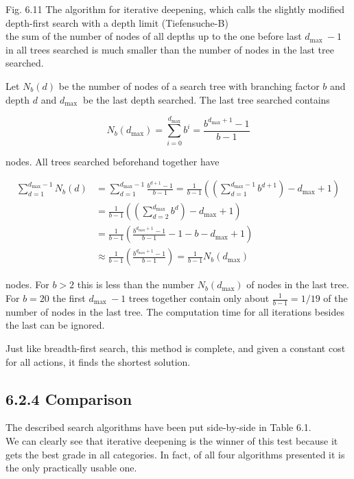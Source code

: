 \documentclass[10pt]{article}
\begin{document}
Fig. 6.11 The algorithm for iterative deepening, which calls the slightly modified depth-first search with a depth limit (Tiefensuche-B)\\
the sum of the number of nodes of all depths up to the one before last $d_{\text {max }}-1$ in all trees searched is much smaller than the number of nodes in the last tree searched.


Let $N_{b}(d)$ be the number of nodes of a search tree with branching factor $b$ and depth $d$ and $d_{\text {max }}$ be the last depth searched. The last tree searched contains

$$
N_{b}\left(d_{\max }\right)=\sum_{i=0}^{d_{\max }} b^{i}=\frac{b^{d_{\max }+1}-1}{b-1}
$$

nodes. All trees searched beforehand together have

$$
\begin{aligned}
\sum_{d=1}^{d_{\max }-1} N_{b}(d) & =\sum_{d=1}^{d_{\max }-1} \frac{b^{d+1}-1}{b-1}=\frac{1}{b-1}\left(\left(\sum_{d=1}^{d_{\max }-1} b^{d+1}\right)-d_{\max }+1\right) \\
& =\frac{1}{b-1}\left(\left(\sum_{d=2}^{d_{\max }} b^{d}\right)-d_{\max }+1\right) \\
& =\frac{1}{b-1}\left(\frac{b^{d_{\max }+1}-1}{b-1}-1-b-d_{\max }+1\right) \\
& \approx \frac{1}{b-1}\left(\frac{b^{d_{\max }+1}-1}{b-1}\right)=\frac{1}{b-1} N_{b}\left(d_{\max }\right)
\end{aligned}
$$

nodes. For $b>2$ this is less than the number $N_{b}\left(d_{\max }\right)$ of nodes in the last tree. For $b=20$ the first $d_{\text {max }}-1$ trees together contain only about $\frac{1}{b-1}=1 / 19$ of the number of nodes in the last tree. The computation time for all iterations besides the last can be ignored.

Just like breadth-first search, this method is complete, and given a constant cost for all actions, it finds the shortest solution.

\subsection*{6.2.4 Comparison}
The described search algorithms have been put side-by-side in Table 6.1.\\
We can clearly see that iterative deepening is the winner of this test because it gets the best grade in all categories. In fact, of all four algorithms presented it is the only practically usable one.
\end{document}
